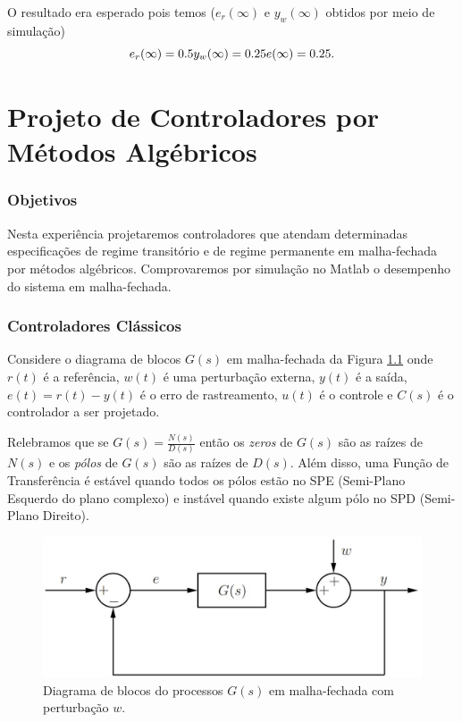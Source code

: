 \documentclass[
]{book}
\begin{document}
O resultado era esperado pois temos (\(e_r(\infty)\) e \(y_w(\infty)\) obtidos por meio de simulação)
\[
e_r(\infty) = 0.5 \\
y_w(\infty) = 0.25 \\
e(\infty) = 0.25.
\]

\hypertarget{projeto-de-controladores-por-muxe9todos-alguxe9bricos}{%
\chapter{Projeto de Controladores por Métodos Algébricos}\label{projeto-de-controladores-por-muxe9todos-alguxe9bricos}}

\hypertarget{objetivos}{%
\subsection*{Objetivos}\label{objetivos}}

Nesta experiência projetaremos controladores que atendam determinadas especificações de regime transitório e de regime permanente em malha-fechada por métodos algébricos. Comprovaremos por simulação no Matlab o desempenho do sistema em malha-fechada.

\hypertarget{controladores-cluxe1ssicos}{%
\subsection*{Controladores Clássicos}\label{controladores-cluxe1ssicos}}

Considere o diagrama de blocos \(G(s)\) em malha-fechada da Figura \ref{fig:fig51} onde \(r(t)\) é a referência, \(w(t)\) é uma perturbação externa, \(y(t)\) é a saída, \(e(t) = r(t) - y(t)\) é o erro de rastreamento, \(u(t)\) é o controle e \(C(s)\) é o controlador a ser projetado.

Relebramos que se \(G(s) = \frac {N(s)}{D(s)}\) então os \emph{zeros} de \(G(s)\) são as raízes de \(N(s)\) e os \emph{pólos} de \(G(s)\) são as raízes de \(D(s)\). Além disso, uma Função de Transferência é estável quando todos os pólos estão no SPE (Semi-Plano Esquerdo do plano complexo) e instável quando existe algum pólo no SPD (Semi-Plano Direito).

\begin{figure}

{\centering \includegraphics[width=0.8\linewidth]{Imagens/Lab4/Apresentação/fig1} 

}

\caption{Diagrama de blocos do processos $G(s)$ em malha-fechada com perturbação $w$.}\label{fig:fig51}
\end{figure}
\end{document}

